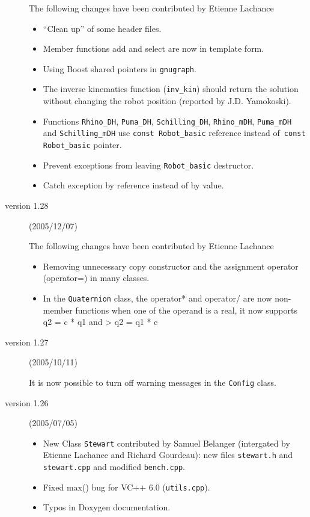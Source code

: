 \documentclass[dvips,11pt,fleqn]{report}
\begin{document}
\begin{description}
  The following changes have been contributed by Etienne Lachance
  \begin{itemize}
  \item ``Clean up'' of some header files.
  \item Member functions add and select are now in template form.
  \item Using \textsf{Boost} shared pointers in \texttt{gnugraph}.
  \item The inverse kinematics function (\texttt{inv\_kin}) should
    return the solution without changing the robot position (reported
    by J.D. Yamokoski).
  \item Functions \texttt{Rhino\_DH}, \texttt{Puma\_DH},
    \texttt{Schilling\_DH}, \texttt{Rhino\_mDH}, \texttt{Puma\_mDH}
    and \texttt{Schilling\_mDH} use \texttt{const Robot\_basic}
    reference instead of\texttt{ const Robot\_basic} pointer.
  \item Prevent exceptions from leaving \texttt{Robot\_basic} destructor.
  \item Catch exception by reference instead of by value.
  \end{itemize}
  
\item[version 1.28] (2005/12/07)

  The following changes have been contributed by Etienne Lachance
  \begin{itemize}
  \item Removing unnecessary copy constructor and the assignment
    operator (operator=) in many classes.
  \item In the \texttt{Quaternion} class, the operator* and operator/
    are now non-member functions when one of the operand is a real, it
    now supports q2 = c * q1 and > q2 = q1 * c
  \end{itemize}

\item[version 1.27] (2005/10/11)

  It is now possible to turn off warning messages in the
  \texttt{Config} class.
  
\item[version 1.26] (2005/07/05)
  \begin{itemize}
  \item New Class \texttt{Stewart} contributed by Samuel Belanger
    (intergated by Etienne Lachance and Richard Gourdeau): new files
    \texttt{stewart.h} and \texttt{stewart.cpp} and modified
    \texttt{bench.cpp}.
  \item Fixed max() bug for VC++ 6.0 (\texttt{utils.cpp}).
  \item Typos in Doxygen documentation.
  \end{itemize}
  

\end{description}
\end{document}
